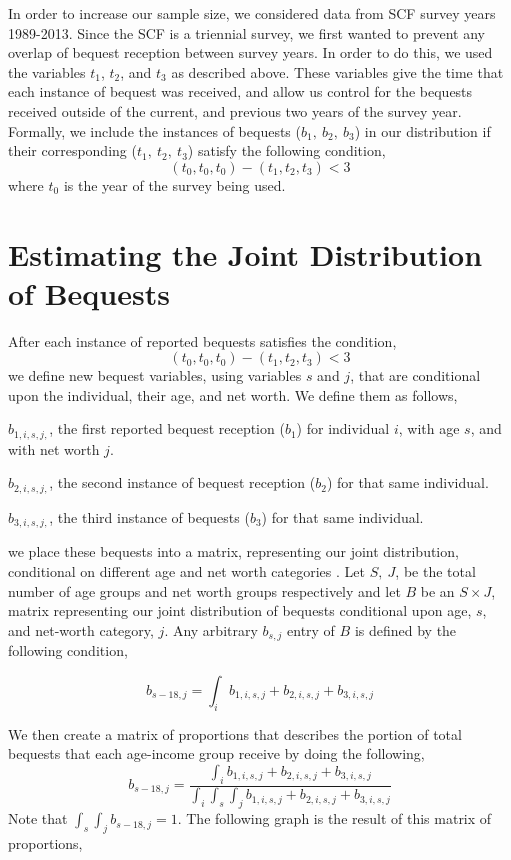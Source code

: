 \documentclass[letterpaper,12pt]{article}
\theoremstyle{definition}
\begin{document}
\begin{spacing}{1.5}
  In order to increase our sample size, we considered data from SCF survey years 1989-2013. Since the SCF is a triennial survey, we first wanted to prevent any overlap of bequest reception between survey years. In order to do this, we used the variables $t_1$, $t_2$, and $t_3$  as described above. These variables give the time that each instance of bequest was received, and allow us control for the bequests received outside of the current, and previous two years of the survey year. Formally, we include the instances of bequests ($b_1, ~ b_2,~b_3$) in our distribution if their corresponding ($t_1,~ t_2,~t_3$) satisfy the following condition,
  \[(t_0,t_0,t_0) - (t_1, t_2,t_3)<3\]
  where $t_0$ is the year of the survey being used.

\section{Estimating the Joint Distribution of Bequests}\label{SecDist}

  After each instance of reported bequests satisfies the condition,
  \[(t_0,t_0,t_0) - (t_1, t_2,t_3)<3\]
  we define new bequest variables, using variables $s$ and $j$, that are conditional upon the individual, their age, and net worth. We define them as follows,
  
  $b_{1,i,s,j,}$, the first reported bequest reception ($b_1$) for individual $i$, with age $s$, and with net worth $j$.
  
  $b_{2,i,s,j,}$, the second instance of bequest reception ($b_2$) for that same individual.
  
  $b_{3,i,s,j,}$, the third instance of bequests ($b_3$) for that same individual.
  
   we place these bequests into a matrix, representing our joint distribution, conditional on different age and net worth categories . Let $S, ~J$, be the total number of age groups and net worth groups respectively and let $B$ be an $S \times J$, matrix representing our joint distribution of bequests conditional upon age, $s$, and net-worth category, $j$. Any arbitrary $b_{s,j}$ entry of $B$ is defined by the following condition,

\[ b_{s-18,j} = \int_i b_{1,i,s,j} + b_{2,i,s,j} +b_{3,i,s,j}\]
           

   We then create a matrix of proportions that describes the portion of total bequests that each age-income group receive by doing the following,
   \[b_{s-18,j} = \frac{\int_i b_{1,i,s,j} + b_{2,i,s,j} +b_{3,i,s,j}}{\int_i \int_s \int_j b_{1,i,s,j} + b_{2,i,s,j} +b_{3,i,s,j}}\]
  Note that $\int_s \int_j b_{s-18,j} = 1$. The following graph is the result of this matrix of proportions, 


\end{spacing}
\end{document}
